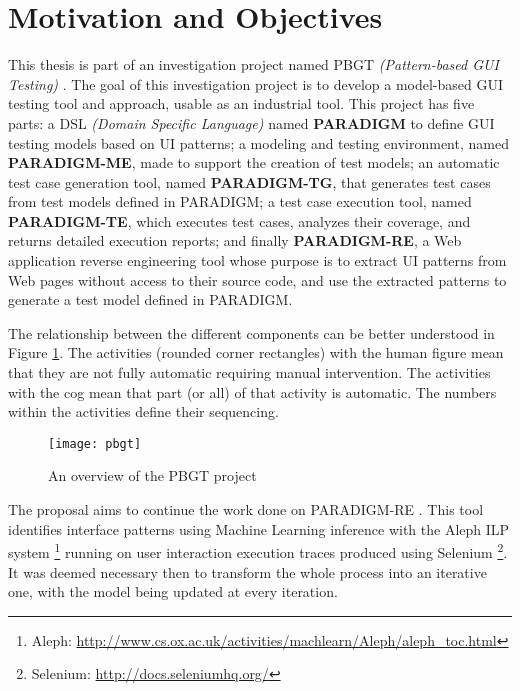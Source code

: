 \section{Motivation and Objectives} \label{sec:goals}

This thesis is part of an investigation project named PBGT \textit{(Pattern-based GUI Testing)} \cite{moreira2013pattern}. The goal of this investigation project is to develop a model-based GUI testing tool and approach, usable as an industrial tool. This project has five parts: a DSL \textit{(Domain Specific Language)} named \textbf{PARADIGM} to define GUI testing models based on UI patterns; a modeling and testing environment, named \textbf{PARADIGM-ME}, made to support the creation of test models; an automatic test case generation tool, named \textbf{PARADIGM-TG}, that generates test cases from test models defined in PARADIGM; a test case execution tool, named \textbf{PARADIGM-TE}, which executes test cases, analyzes their coverage, and returns detailed execution reports; and finally \textbf{PARADIGM-RE}, a Web application reverse engineering tool whose purpose is to extract UI patterns from Web pages without access to their source code, and use the extracted patterns to generate a test model defined in PARADIGM. 

The relationship between the different components can be better understood in Figure \ref{fig:pbgt}. The activities (rounded corner rectangles) with the human figure mean that they are not fully automatic requiring manual intervention. The activities with the cog mean that part (or all) of that activity is automatic. The numbers within the activities define their sequencing.

\begin{figure}[!htb]
  \begin{center}
    \leavevmode
    \texttt{[image: pbgt]}
  	\caption[An overview of the PBGT project]{An overview of the PBGT project \cite{nabuco2013inferring}}
  	\label{fig:pbgt}
   \end{center}
\end{figure}

The proposal aims to continue the work done on PARADIGM-RE \cite{nabuco2013inferring}. This tool identifies interface patterns using Machine Learning inference with the Aleph ILP system \footnote{Aleph: \url{http://www.cs.ox.ac.uk/activities/machlearn/Aleph/aleph\_toc.html}} running on user interaction execution traces produced using Selenium \footnote{Selenium: \url{http://docs.seleniumhq.org/}}. It was deemed necessary then to transform the whole process into an iterative one, with the model being updated at every iteration. 

